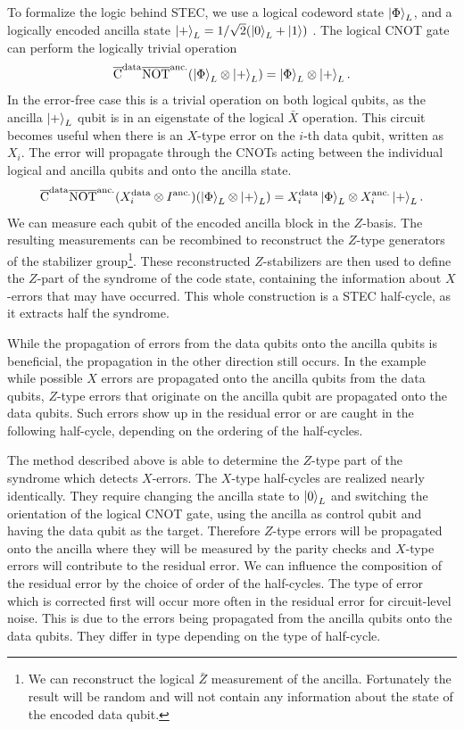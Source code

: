 To formalize the logic behind STEC, we use a logical codeword state $\ket{\Phi}_L$, and a logically encoded ancilla state $\ket{+}_L = 1/\sqrt{2} (\ket{0}_L + \ket{1})$ \cite{friederike_steane}.
The logical CNOT gate can perform the logically trivial operation
\begin{equation}
    \overline{\text{C}}^{\text{data}}\overline{\text{NOT}}^{\text{anc.}}(\ket{\Phi}_L \otimes \ket{+}_L) = \ket{\Phi}_L \otimes \ket{+}_L.
\end{equation}
In the error-free case this is a trivial operation on both logical qubits, as the ancilla $\ket{+}_L$ qubit is in an eigenstate of the logical $\bar{X}$ operation.
This circuit becomes useful when there is an $X$-type error on the $i$-th data qubit, written as $X_i$. 
The error will propagate through the CNOTs acting between the individual logical and ancilla qubits and onto the ancilla state.
\begin{equation}
    \overline{\text{C}}^{\text{data}}\overline{\text{NOT}}^{\text{anc.}} (X_i^{\text{data}} \otimes I^{\text{anc.}} ) (\ket{\Phi}_L \otimes \ket{+}_L) = X_i^{\text{data}} \ket{\Phi}_L \otimes X_i^{\text{anc.}}\ket{+}_L.
\end{equation}
We can measure each qubit of the encoded ancilla block in the $Z$-basis. 
The resulting measurements can be recombined to reconstruct the $Z$-type generators of the stabilizer group\footnote{
    We can reconstruct the logical $\bar{Z}$ measurement of the ancilla. 
    Fortunately the result will be random and will not contain any information about the state of the encoded data qubit.
}.
These reconstructed $Z$-stabilizers are then used to define the $Z$-part of the syndrome of the code state, 
containing the information about $X$-errors that may have occurred.
This whole construction is a STEC half-cycle, as it extracts half the syndrome.

While the propagation of errors from the data qubits onto the ancilla qubits is beneficial, the propagation in the other direction still occurs.
In the example while possible $X$ errors are propagated onto the ancilla qubits from the data qubits, 
$Z$-type errors that originate on the ancilla qubit are propagated onto the data qubits.
Such errors show up in the residual error or are caught in the following half-cycle, depending on the ordering of the half-cycles.

The method described above is able to determine the $Z$-type part of the syndrome which detects $X$-errors.
The $X$-type half-cycles are realized nearly identically.
They require changing the ancilla state to $\ket{0}_L$ and switching the orientation of the logical CNOT gate, 
using the ancilla as control qubit and having the data qubit as the target.
Therefore $Z$-type errors will be propagated onto the ancilla 
where they will be measured by the parity checks and $X$-type errors will contribute to the residual error.
We can influence the composition of the residual error by the choice of order of the half-cycles.
The type of error which is corrected first will occur more often in the residual error for circuit-level noise. 
This is due to the errors being propagated from the ancilla qubits onto the data qubits.
They differ in type depending on the type of half-cycle.

